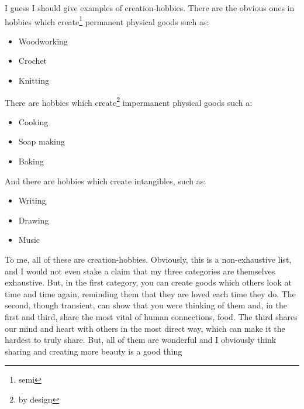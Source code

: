 \documentclass[12pt]{article}[titlepage]
\newcommand{\1}{\={a}}
\newcommand{\2}{\={e}}
\newcommand{\3}{\={\i}}
\newcommand{\4}{\=o}
\newcommand{\5}{\=u}
\newcommand{\6}{\={A}}
\renewcommand{\,}{\textsuperscript{,}}
\begin{document}
I guess I should give examples of creation-hobbies.
There are the obvious ones in hobbies which create\footnote{semi} permanent physical goods such as:
\begin{itemize}
\item Woodworking
\item Crochet
\item Knitting
\end{itemize}
There are hobbies which create\footnote{by design} impermanent physical goods such a:
\begin{itemize}
\item Cooking
\item Soap making
\item Baking
\end{itemize}
And there are hobbies which create intangibles, such as:
\begin{itemize}
\item Writing
\item Drawing
\item Music
\end{itemize}
To me, all of these are creation-hobbies.
Obviously, this is a non-exhaustive list, and I would not even stake a claim that my three categories are themselves exhaustive.
But, in the first category, you can create goods which others look at time and time again, reminding them that they are loved each time they do.
The second, though transient, can show that you were thinking of them and, in the first and third, share the most vital of human connections, food.
The third shares our mind and heart with others in the most direct way, which can make it the hardest to truly share.
But, all of them are wonderful and I obviously think sharing and creating more beauty is a good thing
\end{document}
